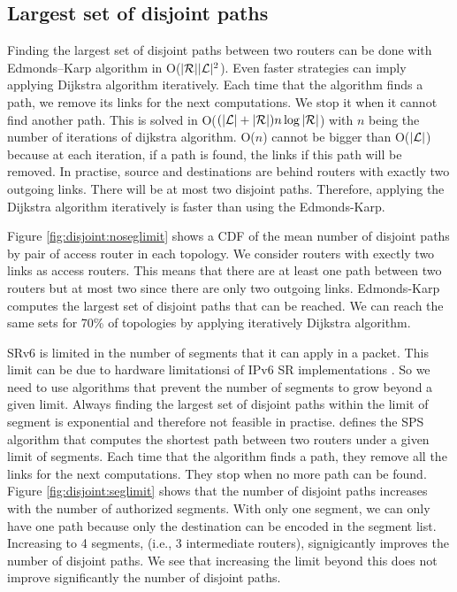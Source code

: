 \subsection{Largest set of disjoint paths}

Finding the largest set of disjoint paths between two routers can be done with Edmonds–Karp algorithm \cite{edmondskarp} in O($|\mathcal{R}||\mathcal{L}|^2$).
Even faster strategies can imply applying Dijkstra algorithm iteratively.
Each time that the algorithm finds a path, we remove its links for the next computations.
We stop it when it cannot find another path.
This is solved in O($(|\mathcal{L}|+|\mathcal{R}|)n\log{|\mathcal{R}|}$) with $n$ being the number of iterations of dijkstra algorithm.
O($n$) cannot be bigger than O($|\mathcal{L}|$) because at each iteration, if a path is found, the links if this path will be removed.
In practise, source and destinations are behind routers with exactly two outgoing links.
There will be at most two disjoint paths.
Therefore, applying the Dijkstra algorithm iteratively is faster than using the Edmonds-Karp.

Figure \ref{fig:disjoint:noseglimit} shows a CDF of the mean number of disjoint paths by pair of access router in each topology.
We consider routers with exectly two links as access routers.
This means that there are at least one path between two routers but at most two since there are only two outgoing links.
Edmonds-Karp computes the largest set of disjoint paths that can be reached.
We can reach the same sets for 70\% of topologies by applying iteratively Dijkstra algorithm.

SRv6 is limited in the number of segments that it can apply in a packet.
This limit can be due to hardware limitationsi of IPv6 SR implementations \cite{Tantsura_SID:2017}.
So we need to use algorithms that prevent the number of segments to grow beyond a given limit.
Always finding the largest set of disjoint paths within the limit of segment is exponential and therefore not feasible in practise.
\cite{aubry2015traffic} defines the SPS algorithm that computes the shortest path between two routers
under a given limit of segments.
Each time that the algorithm finds a path, they remove all the links for the next computations.
They stop when no more path can be found.
Figure \ref{fig:disjoint:seglimit} shows that the number of disjoint paths increases with the number of authorized segments.
With only one segment, we can only  have one path because only the destination can be encoded in the segment list.
Increasing to 4 segments, (i.e., 3 intermediate routers), signigicantly improves the number of disjoint paths.
We see that increasing the limit beyond this does not improve significantly the number of disjoint paths.

